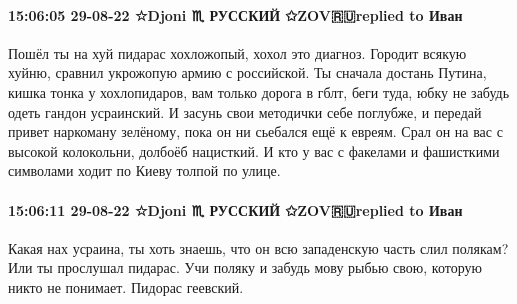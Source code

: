  
 
 
 
 

\paragraph{15:06:05 29-08-22 ☆Djoni ♏ РУССКИЙ ✩ZOV🇷🇺replied to Иван}

Пошёл ты на хуй пидарас хохложопый, хохол это диагноз. Городит всякую хуйню,
сравнил укрожопую армию с российской. Ты сначала достань Путина, кишка тонка у
хохлопидаров, вам только дорога в гблт, беги туда, юбку не забудь одеть гандон
усраинский. И засунь свои методички себе поглубже, и передай привет наркоману
зелёному, пока он ни сьебался ещё к евреям. Срал он на вас с высокой
колокольни, долбоёб нацисткий. И кто у вас с факелами и фашисткими символами
ходит по Киеву толпой по улице.

\paragraph{15:06:11 29-08-22 ☆Djoni ♏ РУССКИЙ ✩ZOV🇷🇺replied to Иван}

Какая нах усраина, ты хоть знаешь, что он всю западенскую часть слил полякам?
Или ты прослушал пидарас. Учи поляку и забудь мову рыбью свою, которую никто не
понимает. Пидорас геевский.

